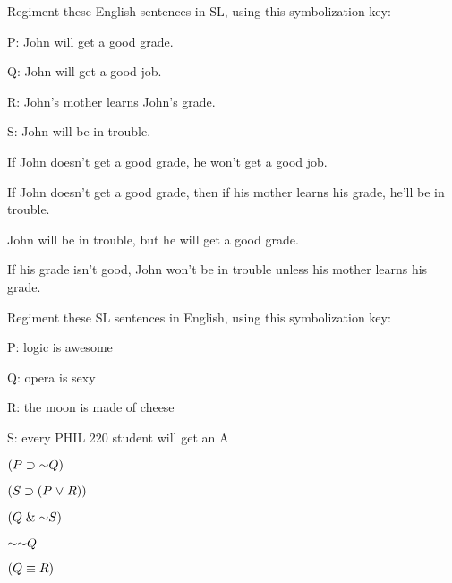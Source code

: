 \problempart
\label{HW2.C}
Regiment these English sentences in SL, using this symbolization key:
\begin{ekey}
\item[P:] John will get a good grade.
\item[Q:] John will get a good job.
\item[R:] John's mother learns John's grade.
\item[S:] John will be in trouble.
\end{ekey}
	\begin{earg}
		\item If John doesn’t get a good grade, he won’t get a good job.
		\item If John doesn’t get a good grade, then if his mother learns his grade, he’ll be in
trouble.
		\item John will be in trouble, but he will get a good grade.
		\item If his grade isn't good, John won't be in trouble unless his mother learns his grade.
	\end{earg}

	
\problempart
\label{HW2.D}

Regiment these SL sentences in English, using this symbolization key:
\begin{ekey}
\item[P:] logic is awesome
\item[Q:] opera is sexy
\item[R:] the moon is made of cheese
\item[S:] every PHIL 220 student will get an A
\end{ekey}
	\begin{earg}
		\item $(P \eif \enot Q)$
		\item $(S \supset (P \mkern1mu\vee\mkern1mu R))$
		\item $(Q \eand \enot S)$
		\item $\enot \enot Q$
		\item $(Q \equiv R)$
	\end{earg}
	
\fi
